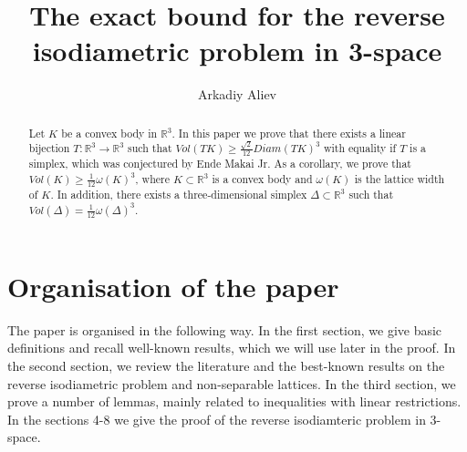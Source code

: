 \documentclass[12pt]{article}
\newcommand\R{\mathbb R}
\begin{document}
\title{The exact bound for the reverse isodiametric problem in 3-space
}
\author{Arkadiy Aliev}
\date{}
\maketitle

    \begin{abstract}
        Let $K$ be a convex body in $\R^{3}$. In this paper we prove that there exists a linear bijection $T:\mathbb{R}^{3}\to \mathbb{R}^{3}$ such that $Vol(TK)\geq \frac{\sqrt{2}}{12}Diam(TK)^3$ with equality if $T$ is a simplex, which was conjectured by Ende Makai Jr.      
        As a corollary, we prove that $Vol(K)\geq \frac{1}{12}\omega(K)^3$, where $K\subset \mathbb{R}^{3}$ is a convex body and  $\omega(K)$ is the lattice width of $K$. In addition, there exists a  three-dimensional simplex $\Delta\subset \mathbb{R}^3$ such that $Vol(\Delta) = \frac{1}{12}\omega(\Delta)^3.$
    \end{abstract}



\section*{Organisation of the paper}

        The paper is organised in the following way. In the first section, we give basic definitions and recall well-known results, which we will use later in the proof. In the second section, we review  the literature and the best-known results on the reverse isodiametric problem and non-separable lattices. In the third section, we prove a number of lemmas, mainly related to inequalities with linear restrictions. In the sections 4-8 we give the proof of the reverse isodiamteric problem in 3-space.   
    \tableofcontents
\end{document}
